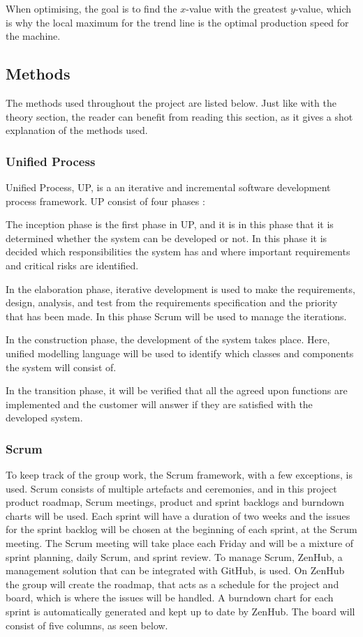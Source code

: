 When optimising, the goal is to find the \(x\)-value with the greatest
\(y\)-value, which is why the local maximum for the trend line is the optimal
production speed for the machine. 


\subsection{Methods}
The methods used throughout the project are listed below. Just like with the
theory section, the reader can benefit from reading this section, as it gives
a shot explanation of the methods used.

\subsubsection{Unified Process}
Unified Process, UP, is a an iterative and incremental software development
process framework. UP consist of four phases \cite{up}: 

The inception phase is the first phase in UP, and it is in this phase that it
is determined whether the system can be developed or not. In this phase it is
decided which responsibilities the system has and where important requirements
and critical risks are identified. 

In the elaboration phase, iterative development is used to make the requirements,
design, analysis, and test from the requirements specification and the priority
that has been made. In this phase Scrum will be used to manage the iterations.

In the construction phase, the development of the system takes place. Here, 
unified modelling language will be used to identify which classes and components
the system will consist of. 

In the transition phase, it will be verified that all the agreed upon
functions are implemented and the customer will answer if they are satisfied
with the developed system.


\subsubsection{Scrum}
To keep track of the group work, the Scrum framework, with a few exceptions, is
used. Scrum consists of multiple artefacts and ceremonies, and in this project
product roadmap, Scrum meetings, product and sprint backlogs and burndown charts
will be used.\cite{scrum} Each sprint will have a duration of two weeks and the issues for
the sprint backlog will be chosen at the beginning of each sprint, at the Scrum
meeting. The Scrum meeting will take place each Friday and will be a mixture of
sprint planning, daily Scrum, and sprint review. To manage Scrum, ZenHub, a
management solution that can be integrated with GitHub, is used. On ZenHub the
group will create the roadmap, that acts as a schedule for the project and
board, which is where the issues will be handled. A burndown chart for each
sprint is automatically generated and kept up to date by ZenHub. The board will
consist of five columns, as seen below.


